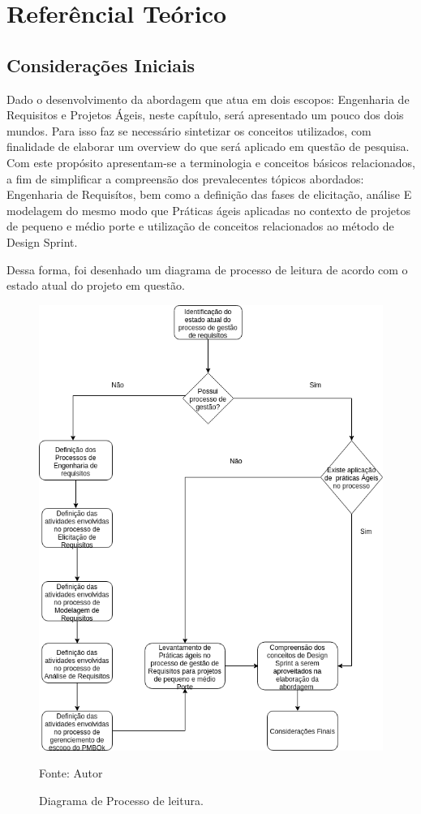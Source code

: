 \chapter[Referêncial Teórico]{Referêncial Teórico}

\section{Considerações Iniciais}
Dado o desenvolvimento da abordagem que atua em dois escopos: Engenharia de Requisitos e Projetos Ágeis, neste capítulo, será apresentado um pouco dos dois mundos. Para isso faz se necessário sintetizar os conceitos utilizados, com finalidade de elaborar um overview do que será aplicado em questão de pesquisa. Com este propósito apresentam-se a terminologia e conceitos básicos relacionados, a fim de simplificar a compreensão dos prevalecentes tópicos abordados: Engenharia de Requisítos, bem como a definição das fases de elicitação, análise E modelagem do mesmo modo que  Práticas ágeis aplicadas no contexto de projetos de pequeno e médio porte e utilização de conceitos relacionados ao método de Design Sprint.


\newpage
Dessa forma, foi desenhado um diagrama de processo de leitura de acordo com o estado atual do projeto em questão.
\begin{figure}[!htb]
\centering
\label{fig01}
\includegraphics[keepaspectratio=true,scale=0.6]{figuras/Diagrama_de_Processos.png}
\caption{Diagrama de Processo de leitura.}
{Fonte: Autor}
\end{figure}
\newpage

